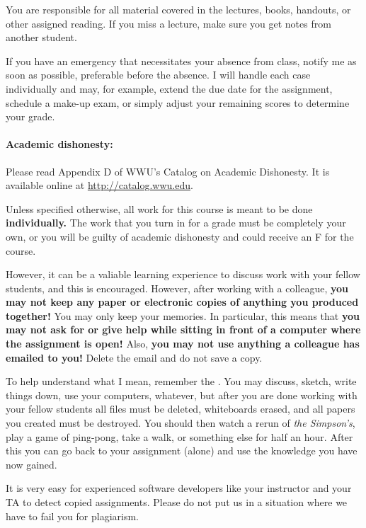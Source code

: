 \documentclass{article}
\begin{document}
  You are responsible for all material covered in the lectures, books,
  handouts, or other assigned reading.  If you miss a lecture,
  make sure you get notes from another student.

  If you have an emergency that necessitates your absence from class,
  notify me as soon as possible, preferable before the absence.  I
  will handle each case individually and may, for example, extend the
  due date for the assignment, schedule a make-up exam, or simply
  adjust your remaining scores to determine your grade.

\paragraph{Academic dishonesty:} Please read Appendix D of WWU's Catalog on
  Academic Dishonesty.  It is available online at
  \url{http://catalog.wwu.edu}.

  Unless specified otherwise, all work for this course is meant to
  be done {\bf individually.}  The work that you turn in for a grade
  must be completely your own, or you will be guilty of academic
  dishonesty and could receive an F for the course.

  However, it can be a valiable learning experience to discuss
  work with your fellow students, and this is encouraged.
  However, after working with a colleague, {\bf you may not keep any
    paper or electronic copies of anything you produced together!}
  You may only keep your memories.  In particular, this means that
  {\bf you may not ask for or give help while sitting in front of a
    computer where the assignment is open!}  Also, {\bf you may not
    use anything a colleague has emailed to you!}  Delete the email
  and do not save a copy.

  To help understand what I mean, remember the .  You may discuss, sketch, write things down, use
  your computers, whatever, but after you are done working with your
  fellow students all files must be deleted, whiteboards erased, and
  all papers you created must be destroyed.  You should then watch a
  rerun of {\em the Simpson's}, play a game of ping-pong, take a walk,
  or something else for half an hour. After this you can go back to
  your assignment (alone) and use the knowledge you have now gained.

  It is very easy for experienced software developers like your
  instructor and your TA to detect copied assignments.  Please do not
  put us in a situation where we have to fail you for plagiarism.
\end{document}
